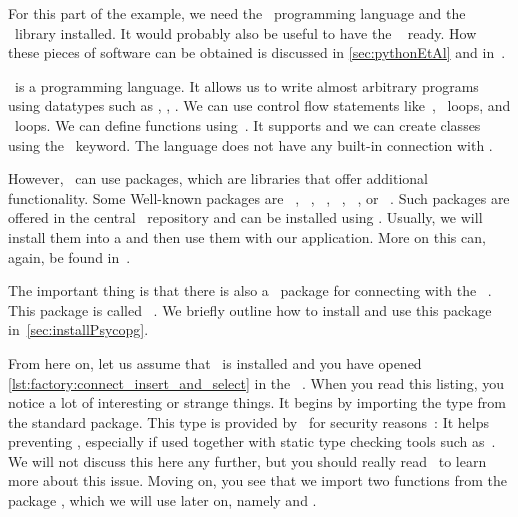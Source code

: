 For this part of the example, we need the \python\ programming language and the \psycopg~library installed.
It would probably also be useful to have the \pycharm\  ready.
How these pieces of software can be obtained is discussed in \cref{sec:pythonEtAl} and in~\cite{programmingWithPython}.

\python\ is a programming language.
It allows us to write almost arbitrary programs using datatypes such as , , .
We can use control flow statements like~, ~loops, and ~loops.
We can define functions using~.
It supports  and we can create classes using the ~keyword.
The language does not have any built-in connection with \postgresql.

However, \python\ can use packages, which are libraries that offer additional functionality.
Some Well-known packages are \numpy~\cite{HMvdWGVCWTBSKPHvKBHFdRWPGMSRWAGO2020APWN,N2025N,DBvR2024ITN,J2018NPSCADSAWNSAM}, \pandas~\cite{PD2025P,B2012DPWP,L2024PW}, \scikitlearn~\cite{PVGMTGBPWDVPCBPD2011SMLIP,RLM2022MLWPAS}, \scipy~\cite{VGOHRCBPWBvdWBWMMNJKLCPFMVLPCHQHARPvMS2020SFAFSCIP,J2018NPSCADSAWNSAM}, \tensorflow~\cite{ABCCDDDGIIKLMMMSTVWWYZ2016TASFLSML,L2023TDDBTADMLMWT}, or \pytorch~\cite{PGMLBCKLGADKYDRTCSFBC2019PAISHPDLL,RLM2022MLWPAS}.
Such packages are offered in the central \pypi\ repository and can be installed using \pip.
Usually, we will install them into a  and then use them with our application.
More on this can, again, be found in~\cite{programmingWithPython}.

The important thing is that there is also a \python\ package for connecting with the \postgresql\ \dbms.
This package is called \psycopg~\cite{VDGE2010P}.
We briefly outline how to install and use this package in~\cref{sec:installPsycopg}.

%

From here on, let us assume that \psycopg\ is installed and you have opened \cref{lst:factory:connect_insert_and_select} in the \pycharm\ .
When you read this listing, you notice a lot of interesting or strange things.
It begins by importing the type  from the standard  package.
This type is provided by \python\ for security reasons~\cite{PEP675}:
It helps preventing , especially if used together with static type checking tools such as~\mypy.
We will not discuss this here any further, but you should really read~\cite{PEP675,VDGE2022PPDAFP:ST} to learn more about this issue.
Moving on, you see that we import two functions from the package \psycopg, which we will use later on, namely  and .

